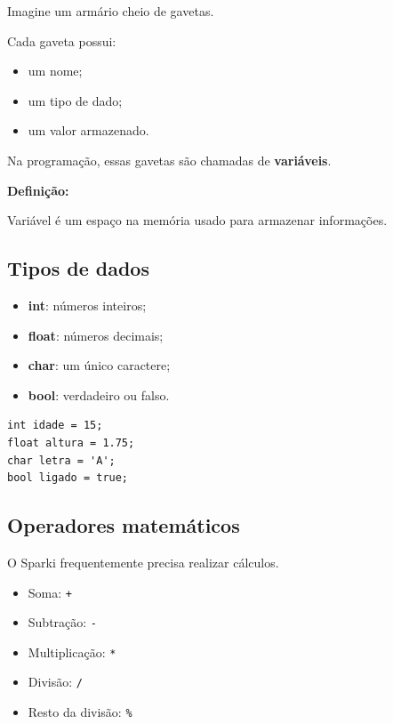 \documentclass[conference]{IEEEtran}
\begin{document}
Imagine um armário cheio de gavetas.

Cada gaveta possui:
\begin{itemize}
    \item um nome;
    \item um tipo de dado;
    \item um valor armazenado.
\end{itemize}

Na programação, essas gavetas são chamadas de \textbf{variáveis}.

\vspace{0.2cm}

\textbf{Definição:}

Variável é um espaço na memória usado para armazenar informações.

\subsection{Tipos de dados}

\begin{itemize}
    \item \textbf{int}: números inteiros;
    \item \textbf{float}: números decimais;
    \item \textbf{char}: um único caractere;
    \item \textbf{bool}: verdadeiro ou falso.
\end{itemize}

\vspace{0.2cm}

\begin{lstlisting}[caption={Exemplo de variáveis}]
int idade = 15;
float altura = 1.75;
char letra = 'A';
bool ligado = true;
\end{lstlisting}

\subsection{Operadores matemáticos}

O Sparki frequentemente precisa realizar cálculos.

\begin{itemize}
    \item Soma: \texttt{+}
    \item Subtração: \texttt{-}
    \item Multiplicação: \texttt{*}
    \item Divisão: \texttt{/}
    \item Resto da divisão: \texttt{\%}
\end{itemize}
\end{document}
